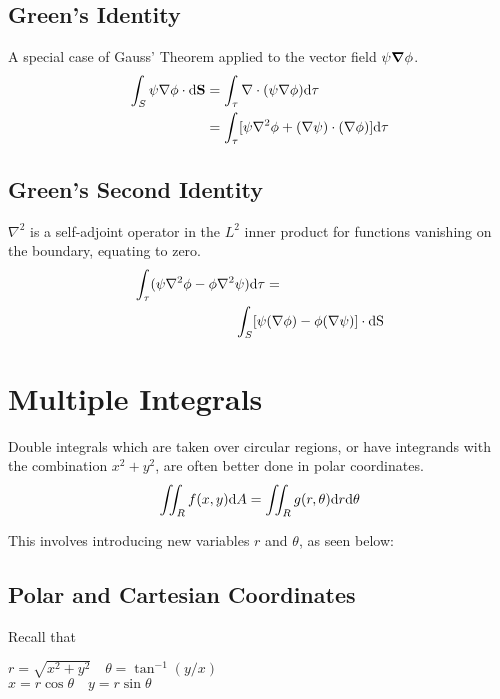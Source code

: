 \subsection*{Green's Identity}
A special case of Gauss' Theorem applied to the vector field $\psi \grad \phi$.
\begin{equation*}
    \begin{aligned}
        \int_{S} \psi \nabla \phi \cdot \differential \mathbf{S} &= \int_{\tau} \nabla \cdot (\psi \nabla \phi) \differential \tau \\
        &= \int_{\tau} [\psi \nabla^2 \phi + (\nabla \psi) \cdot (\nabla \phi)] \differential \tau
    \end{aligned}
\end{equation*}
\subsection*{Green's Second Identity}
$\nabla^2$ is a self-adjoint operator in the $L^2$ inner product for functions vanishing on the boundary, equating to zero.
\begin{equation*}
    \begin{aligned}
    \int_{\tau}(\psi \nabla^2 \phi - \phi \nabla^2 &\psi) \differential \tau = \\
    &\int_{S} [\psi(\nabla \phi) - \phi(\nabla \psi)] \cdot \differential \mathrm{S}
    \end{aligned}
\end{equation*}

\section{Multiple Integrals}
Double integrals which are taken over circular regions, or have integrands with the combination $x^2 + y^2$,
are often better done in polar coordinates.
\begin{equation*}
    \iint_R f(x,y)\differential A = \iint_R g(r,\theta)\differential r \differential \theta
\end{equation*}

This involves introducing new variables $r$ and $\theta$, as seen below:
\subsection*{Polar and Cartesian Coordinates}
Recall that
\vspace{\baselineskip}

$r = \sqrt{x^2 + y^2} \quad \theta = \tan^{-1} (y/x)$ \\
$x = r \cos \theta \quad y = r \sin \theta$ 
\vspace{\baselineskip}

